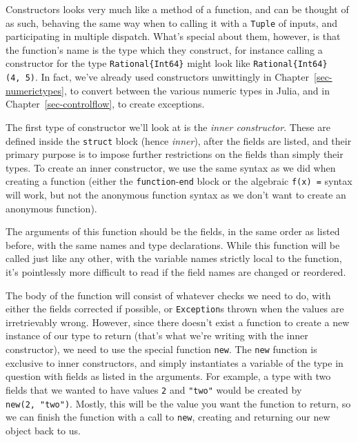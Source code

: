 \documentclass[
  letterpaper,
  DIV=11,
  numbers=noendperiod]{scrreprt}
\begin{document}
Constructors looks very much like a method of a function, and can be
thought of as such, behaving the same way when to calling it with a
\texttt{Tuple} of inputs, and participating in multiple dispatch. What's
special about them, however, is that the function's name is the type
which they construct, for instance calling a constructor for the type
\texttt{Rational\{Int64\}} might look like
\texttt{Rational\{Int64\}(4,\ 5)}. In fact, we've already used
constructors unwittingly in Chapter~\ref{sec-numerictypes}, to convert
between the various numeric types in Julia, and in
Chapter~\ref{sec-controlflow}, to create exceptions.

The first type of constructor we'll look at is the \emph{inner
constructor}. These are defined inside the \texttt{struct} block (hence
\emph{inner}), after the fields are listed, and their primary purpose is
to impose further restrictions on the fields than simply their types. To
create an inner constructor, we use the same syntax as we did when
creating a function (either the \texttt{function}-\texttt{end} block or
the algebraic \texttt{f(x)\ =} syntax will work, but not the anonymous
function syntax as we don't want to create an anonymous function).

\begin{tcolorbox}[enhanced jigsaw, toprule=.15mm, opacitybacktitle=0.6, leftrule=.75mm, breakable, coltitle=black, bottomrule=.15mm, colbacktitle=quarto-callout-tip-color!10!white, bottomtitle=1mm, rightrule=.15mm, title=\textcolor{quarto-callout-tip-color}{\faLightbulb}\hspace{0.5em}{Convention}, colframe=quarto-callout-tip-color-frame, left=2mm, colback=white, opacityback=0, arc=.35mm, toptitle=1mm, titlerule=0mm]

The arguments of this function should be the fields, in the same order
as listed before, with the same names and type declarations. While this
function will be called just like any other, with the variable names
strictly local to the function, it's pointlessly more difficult to read
if the field names are changed or reordered.

\end{tcolorbox}

The body of the function will consist of whatever checks we need to do,
with either the fields corrected if possible, or \texttt{Exception}s
thrown when the values are irretrievably wrong. However, since there
doesn't exist a function to create a new instance of our type to return
(that's what we're writing with the inner constructor), we need to use
the special function \texttt{new}. The \texttt{new} function is
exclusive to inner constructors, and simply instantiates a variable of
the type in question with fields as listed in the arguments. For
example, a type with two fields that we wanted to have values \texttt{2}
and \texttt{"two"} would be created by \texttt{new(2,\ "two")}. Mostly,
this will be the value you want the function to return, so we can finish
the function with a call to \texttt{new}, creating and returning our new
object back to us.
\end{document}
